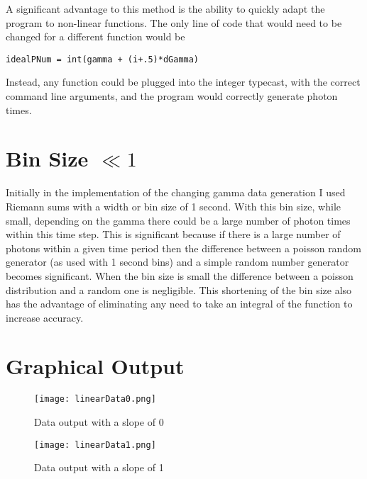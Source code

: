 \documentclass[aps,letterpaper,10pt]{revtex4}
\begin{document}
A significant advantage to this method is the ability to quickly adapt the program to non-linear functions. The only line of code that would need to be changed for a different function would be
\begin{verbatim}
idealPNum = int(gamma + (i+.5)*dGamma)
\end{verbatim}
Instead, any function could be plugged into the integer typecast, with the correct command line arguments, and the program would correctly generate photon times.

\vspace{3mm}


\section{Bin Size $\ll1$}
Initially in the implementation of the changing gamma data generation I used Riemann sums with a width or bin size of 1 second. With this bin size, while small, depending on the gamma there could be a large number of photon times within this time step. This is significant because if there is a large number of photons within a given time period then the difference between a poisson random generator (as used with 1 second bins) and a simple random number generator becomes significant. When the bin size is small the difference between a poisson distribution and a random one is negligible. This shortening of the bin size also has the advantage of eliminating any need to take an integral of the function to increase accuracy.

\section{Graphical Output}

\begin{figure}[h!]
\begin{center} \texttt{[image: linearData0.png]} \caption{Data output with a slope of 0} \end{center}
\vspace{3mm}
\end{figure}

\begin{figure}[h!]
\begin{center} \texttt{[image: linearData1.png]} \caption{Data output with a slope of 1} \end{center}
\vspace{3mm}
\end{figure}
\end{document}
